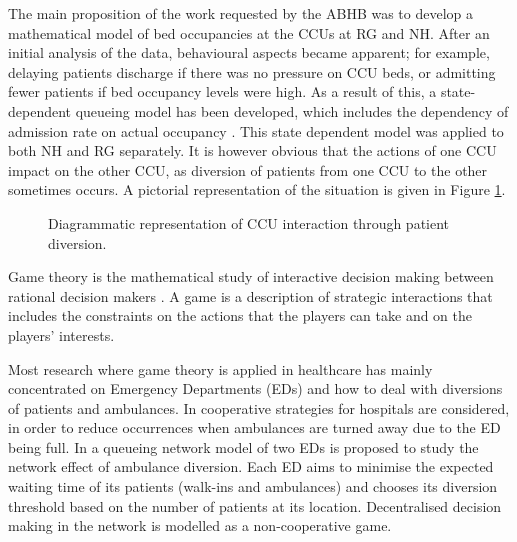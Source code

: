 \documentclass{article}
\begin{document}
The main proposition of the work requested by the ABHB was to develop a mathematical model of bed occupancies at the CCUs at RG and NH.
After an initial analysis of the data, behavioural aspects became apparent; for example, delaying patients discharge if there was no pressure on CCU beds, or admitting fewer patients if bed occupancy levels were high.
As a result of this, a state-dependent queueing model has been developed, which includes the dependency of admission rate on actual occupancy \cite{Komenda2013}.
This state dependent model was applied to both NH and RG separately.
It is however obvious that the actions of one CCU impact on the other CCU, as diversion of patients from one CCU to the other sometimes occurs.
A pictorial representation of the situation is given in Figure \ref{diagramofdiversion}.

\begin{figure}[!htbp]
\begin{center}
\caption{Diagrammatic representation of CCU interaction through patient diversion.}\label{diagramofdiversion}
\end{center}
\end{figure}

Game theory is the mathematical study of interactive decision making between rational decision makers \cite{Maschler2013}.
A game is a description of strategic interactions that includes the constraints on the actions that the players can take and on the players' interests.

Most research where game theory is applied in healthcare has mainly concentrated on Emergency Departments (EDs) and how to deal with diversions of patients and ambulances.
In \cite{Hagtvedt2009} cooperative strategies for hospitals are considered, in order to reduce occurrences when ambulances are turned away due to the ED being full.
In \cite{Deo2011} a queueing network model of two EDs is proposed to study the network effect of ambulance diversion.
Each ED aims to minimise the expected waiting time of its patients (walk-ins and ambulances) and chooses its diversion threshold based on the number of patients at its location. Decentralised decision making in the network is modelled as a non-cooperative game.
\end{document}
